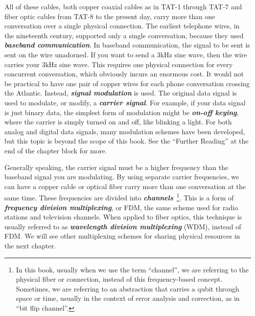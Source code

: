All of these cables, both copper coaxial cables as in TAT-1 through TAT-7 and fiber optic cables from TAT-8 to the present day, carry more than one conversation over a single physical connection.
The earliest telephone wires, in the nineteenth century, supported only a single conversation, because they used \textbf{\emph{baseband communication}}.
In baseband communication, the signal to be sent is sent on the wire unadorned.
If you want to send a 3kHz sine wave, then the wire carries your 3kHz sine wave.
This requires one physical connection for every concurrent conversation, which obviously incurs an enormous cost.
It would not be practical to have one pair of copper wires for each phone conversation crossing the Atlantic.
Instead, \textbf{\emph{signal modulation}} is used.
The original data signal is used to modulate, or modify, a \textbf{\emph{carrier signal}}.
For example, if your data signal is just binary data, the simplest form of modulation might be \textbf{\emph{on-off keying}}, where the carrier is simply turned on and off, like blinking a light.
For both analog and digital data signals, many modulation schemes have been developed, but this topic is beyond the scope of this book.
See the ``Further Reading'' at the end of the chapter block for more.

Generally speaking, the carrier signal must be a higher frequency than the baseband signal you are modulating.
By using separate carrier frequencies, we can have a copper cable or optical fiber carry more than one conversation at the same time. These frequencies are divided into \textbf{\emph{channels}}~\footnote{In this book, usually when we use the term ``channel'', we are referring to the physical fiber or connection, instead of this frequency-based concept. Sometimes, we are referring to an abstraction that carries a qubit through space or time, usually in the context of error analysis and correction, as in ``bit flip channel''.}.
This is a form of \textbf{\emph{frequency division multiplexing}}, or FDM, the same scheme used for radio stations and television channels.
When applied to fiber optics, this technique is usually referred to as \textbf{\emph{wavelength division multiplexing}} (WDM), instead of FDM.
We will see other multiplexing schemes for sharing physical resources in the next chapter.

